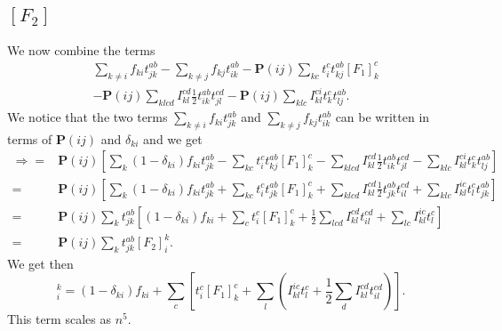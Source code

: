 \documentclass[a4paper,norsk,11pt,twoside]{report}
\begin{document}
\subsection{$[F_2]$}
We now combine the terms
\begin{align}
& \sum_{k \not= i} f_{ki} t_{jk}^{ab}
- \sum_{k \not= j} f_{kj} t_{ik}^{ab} 
- \textbf{P}(ij) \sum_{kc} t_i^c t_{kj}^{ab} [F_1]_k^c
\nonumber \\ &
- \textbf{P}(ij) \sum_{klcd} I_{kl}^{cd} \frac{1}{2} t_{ik}^{ab} t_{jl}^{cd}
- \textbf{P}(ij) \sum_{klc} I_{kl}^{ci} t_k^c t_{lj}^{ab} .
\end{align}
We notice that the two terms $\sum_{k \not= i} f_{ki} t_{jk}^{ab}$ and $\sum_{k \not= j} f_{kj} t_{ik}^{ab}$ can be written in terms of $\textbf{P}(ij)$ and $\delta_{ki}$ and we get
\begin{align}
\Rightarrow = &
\textbf{P}(ij) \left[
\sum_{k} (1 - \delta_{ki}) f_{ki} t_{jk}^{ab}
- \sum_{kc} t_i^c t_{kj}^{ab} [F_1]_k^c
- \sum_{klcd}  I_{kl}^{cd} \frac{1}{2} t_{ik}^{ab} t_{jl}^{cd}
- \sum_{klc} I_{kl}^{ci} t_k^c t_{lj}^{ab}
\right]
\nonumber \\
= &
\textbf{P}(ij) \left[
\sum_{k} (1 - \delta_{ki}) f_{ki} t_{jk}^{ab}
+ \sum_{kc} t_i^c t_{jk}^{ab} [F_1]_k^c
+ \sum_{klcd}  I_{kl}^{cd} \frac{1}{2} t_{jk}^{ab} t_{il}^{cd}
+ \sum_{klc} I_{kl}^{ic} t_l^c t_{jk}^{ab}
\right]
\nonumber \\
= &
\textbf{P}(ij) \sum_k t_{jk}^{ab} \left[
(1 - \delta_{ki}) f_{ki}
+ \sum_c t_i^c [F_1]_k^c
+ \frac{1}{2} \sum_{lcd} I_{kl}^{cd} t_{il}^{cd}
+ \sum_{lc} I_{kl}^{ic} t_l^c
\right]
\nonumber \\
= &
\textbf{P}(ij) \sum_k t_{jk}^{ab} [F_2]_i^k .
\end{align}
We get then
\begin{equation}
[F_2]_i^k = (1 - \delta_{ki}) f_{ki}
+ \sum_c \left[t_i^c [F_1]_k^c
+ \sum_{l} \left( I_{kl}^{ic} t_l^c 
+ \frac{1}{2} \sum_{d} I_{kl}^{cd} t_{il}^{cd}
\right)
\right] .
\label{intermedF2}
\end{equation}
This term scales as $n^5$.
\end{document}
